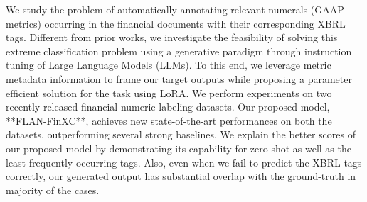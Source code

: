 We study the problem of automatically annotating relevant numerals (GAAP metrics) occurring in the financial documents with their corresponding XBRL tags. Different from prior works, we investigate the feasibility of solving this extreme classification problem using a generative paradigm through instruction tuning of Large Language Models (LLMs). To this end, we leverage metric metadata information to frame our target outputs while proposing a parameter efficient solution for the task using LoRA. We perform experiments on two recently released financial numeric labeling datasets. Our proposed model, **FLAN-FinXC**, achieves new state-of-the-art performances on both the datasets, outperforming several strong baselines. We explain the better scores of our proposed model by demonstrating its capability for zero-shot as well as the least frequently occurring tags. Also, even when we fail to predict the XBRL tags correctly, our generated output has substantial overlap with the ground-truth in majority of the cases.
